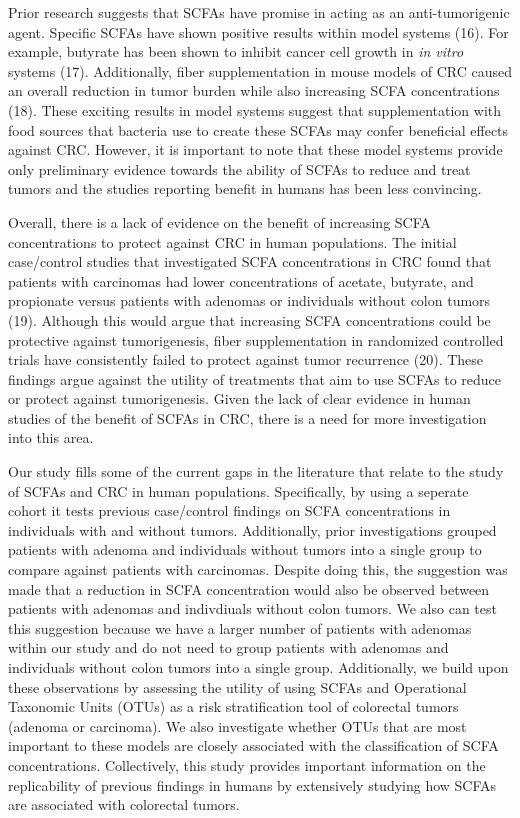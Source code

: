 \documentclass[11pt,]{article}
\begin{document}
Prior research suggests that SCFAs have promise in acting as an
anti-tumorigenic agent. Specific SCFAs have shown positive results
within model systems (16). For example, butyrate has been shown to
inhibit cancer cell growth in \emph{in vitro} systems (17).
Additionally, fiber supplementation in mouse models of CRC caused an
overall reduction in tumor burden while also increasing SCFA
concentrations (18). These exciting results in model systems suggest
that supplementation with food sources that bacteria use to create these
SCFAs may confer beneficial effects against CRC. However, it is
important to note that these model systems provide only preliminary
evidence towards the ability of SCFAs to reduce and treat tumors and the
studies reporting benefit in humans has been less convincing.

Overall, there is a lack of evidence on the benefit of increasing SCFA
concentrations to protect against CRC in human populations. The initial
case/control studies that investigated SCFA concentrations in CRC found
that patients with carcinomas had lower concentrations of acetate,
butyrate, and propionate versus patients with adenomas or individuals
without colon tumors (19). Although this would argue that increasing
SCFA concentrations could be protective against tumorigenesis, fiber
supplementation in randomized controlled trials have consistently failed
to protect against tumor recurrence (20). These findings argue against
the utility of treatments that aim to use SCFAs to reduce or protect
against tumorigenesis. Given the lack of clear evidence in human studies
of the benefit of SCFAs in CRC, there is a need for more investigation
into this area.

Our study fills some of the current gaps in the literature that relate
to the study of SCFAs and CRC in human populations. Specifically, by
using a seperate cohort it tests previous case/control findings on SCFA
concentrations in individuals with and without tumors. Additionally,
prior investigations grouped patients with adenoma and individuals
without tumors into a single group to compare against patients with
carcinomas. Despite doing this, the suggestion was made that a reduction
in SCFA concentration would also be observed between patients with
adenomas and indivdiuals without colon tumors. We also can test this
suggestion because we have a larger number of patients with adenomas
within our study and do not need to group patients with adenomas and
individuals without colon tumors into a single group. Additionally, we
build upon these observations by assessing the utility of using SCFAs
and Operational Taxonomic Units (OTUs) as a risk stratification tool of
colorectal tumors (adenoma or carcinoma). We also investigate whether
OTUs that are most important to these models are closely associated with
the classification of SCFA concentrations. Collectively, this study
provides important information on the replicability of previous findings
in humans by extensively studying how SCFAs are associated with
colorectal tumors.
\end{document}
